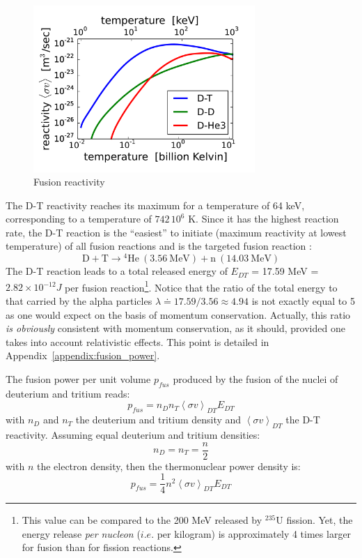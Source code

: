 \begin{figure} 
\begin{center}
\includegraphics[width=0.75\textwidth]{figures/reactivity_DT.png}
\caption{Fusion reactivity }
\label{fig:reactivity}
\end{center}
\end{figure}

The D-T reactivity reaches its maximum for a temperature of 64 keV, corresponding to a temperature of $742\,10^6$ K. Since it has the highest reaction rate, the D-T reaction is the “easiest” to initiate (maximum reactivity at lowest temperature) of all fusion reactions and is the targeted fusion reaction \cite{FusionCEA1987}: 
\begin{equation*}
\mathrm{D + T} \longrightarrow \mathrm{{}^4 He~(3.56~MeV) + n~(14.03~MeV)}
\end{equation*}
The D-T reaction leads to a total released energy of $E_{DT}$ = 17.59 \si{MeV} = $2.82\times 10^{-12} \si{J}$ per fusion reaction\footnote{This value can be compared to the 200 MeV released by $^{235}$U fission. Yet, the energy release \emph{per nucleon} ($i.e.$ per kilogram) is approximately 4 times larger for fusion than for fission reactions.}. Notice that the ratio of the total energy to that carried by the alpha particles $\lambda \doteq 17.59/3.56 \approx 4.94$ is not exactly equal to 5 as one would expect on the basis of momentum conservation. Actually, this ratio \emph{is obviously} consistent with momentum conservation, as it should, provided one takes into account relativistic effects. This point is detailed in Appendix~\ref{appendix:fusion_power}.

The fusion power per unit volume $p_{fus}$ produced by the fusion of the nuclei of deuterium and tritium reads: 
\begin{equation*}
  p_{fus} = n_D n_T \left< \sigma v \right>_{DT} E_{DT}
\end{equation*}
with $n_D$ and $n_T$ the deuterium and tritium density and $\left< \sigma v \right>_{DT}$ the D-T reactivity. Assuming equal deuterium and tritium densities:
\begin{equation*}
  n_D = n_T = \frac{n}{2}
\end{equation*}
with $n$ the electron density, then the thermonuclear power density is:
\begin{equation*}
  p_{fus} = \frac{1}{4} n^2 \left< \sigma v \right>_{DT} E_{DT}
\end{equation*}

